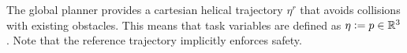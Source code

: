 The global planner provides a cartesian helical trajectory $\eta^r$ that avoids collisions with existing obstacles. This means that task variables are defined as $\eta \vcentcolon = p \in \mathbb{R}^3$. Note that the reference trajectory implicitly enforces safety.
 